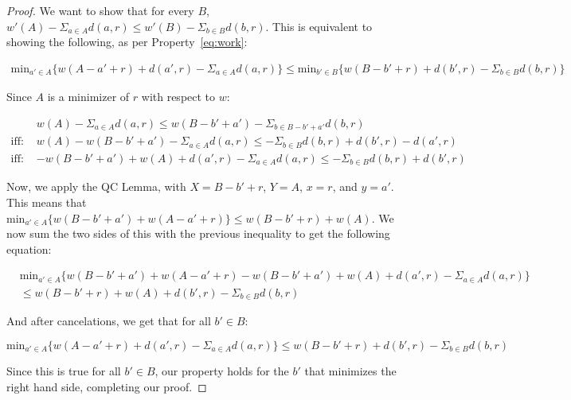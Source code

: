 \begin{proof}
    We want to show that for every $B$, $w'(A) - \Sigma_{a \in A} d(a,r) \leq w'(B) - \Sigma_{b \in B} d(b,r)$. This is equivalent to showing the following, as per Property~\eqref{eq:work}:
    
    \begin{equation*}
        \begin{split}
            \mathrm{min}_{a' \in A} \{ w(A - a' + r) + d(a', r) - \Sigma_{a \in A} d(a,r)\} \leq \mathrm{min}_{b' \in B} \{ w(B - b' + r) + d(b', r) - \Sigma_{b \in B} d(b,r)\}
        \end{split}
    \end{equation*}

    Since $A$ is a minimizer of $r$ with respect to $w$:

    \begin{equation*}
        \begin{split}
            &w(A) - \Sigma_{a \in A} d(a,r) \leq w(B-b' + a') - \Sigma_{b \in B - b' + a'} d(b, r) \\
            \text{iff: } &w(A) - w(B-b' + a') - \Sigma_{a \in A} d(a,r) \leq -\Sigma_{b \in B} d(b, r) + d(b', r) - d(a', r) \\
            \text{iff: } &-w(B - b' + a') + w(A) + d(a', r) - \Sigma_{a \in A} d(a,r) \leq -\Sigma_{b \in B} d(b,r) + d(b', r)
        \end{split}
    \end{equation*}

    Now, we apply the QC Lemma, with $X = B -b' + r$, $Y = A$, $x = r$, and $y = a'$. This means that $\mathrm{min}_{a' \in A} \{ w(B - b' + a') + w(A -a' + r)\} \leq w(B - b' + r) + w(A)$. We now sum the two sides of this with the previous inequality to get the following equation:

    \begin{equation*}
        \begin{split}
            &\mathrm{min}_{a' \in A} \{ w(B - b' + a') + w(A -a' + r) - w(B - b' + a') + w(A) + d(a', r) - \Sigma_{a \in A} d(a, r)\} \\
            &\leq w(B - b' + r) + w(A) + d(b' ,r) - \Sigma_{b \in B} d(b, r)
        \end{split}
    \end{equation*}

    And after cancelations, we get that for all $b' \in B$:

    \begin{equation*}
        \mathrm{min}_{a' \in A} \{ w(A - a' + r) + d(a', r) - \Sigma_{a \in A} d(a,r)\} \leq w(B - b' + r) + d(b', r) - \Sigma_{b \in B} d(b,r)
    \end{equation*}

    Since this is true for all $b' \in B$, our property holds for the $b'$ that minimizes the right hand side, completing our proof.
\end{proof}

